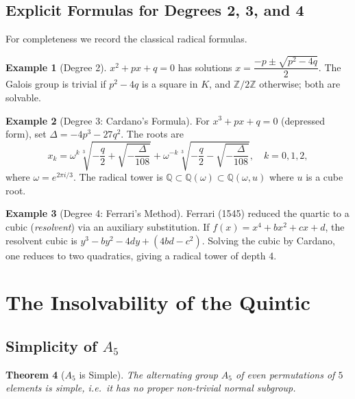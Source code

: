 \documentclass[12pt,a4paper]{amsart}
\newtheorem{theorem}{Theorem}[section]
\theoremstyle{definition}
\newtheorem{example}[theorem]{Example}
\newcommand{\Q}{\mathbb{Q}}
\newcommand{\Z}{\mathbb{Z}}
\begin{document}
\subsection{Explicit Formulas for Degrees 2, 3, and 4}

For completeness we record the classical radical formulas.

\begin{example}[Degree 2]
$x^2 + px + q = 0$ has solutions
$x = \dfrac{-p \pm \sqrt{p^2 - 4q}}{2}$.
The Galois group is trivial if $p^2 - 4q$ is a square in $K$, and $\Z/2\Z$
otherwise; both are solvable.
\end{example}

\begin{example}[Degree 3: Cardano's Formula]
For $x^3 + px + q = 0$ (depressed form), set $\Delta = -4p^3 - 27q^2$.
The roots are
\[
  x_k = \omega^k \sqrt[3]{-\frac{q}{2} + \sqrt{-\frac{\Delta}{108}}}
       + \omega^{-k} \sqrt[3]{-\frac{q}{2} - \sqrt{-\frac{\Delta}{108}}},
  \quad k = 0,1,2,
\]
where $\omega = e^{2\pi i/3}$. The radical tower is
$\Q \subset \Q(\omega) \subset \Q(\omega, u)$ where $u$ is a cube root.
\end{example}

\begin{example}[Degree 4: Ferrari's Method]
Ferrari (1545) reduced the quartic to a cubic (\emph{resolvent}) via an
auxiliary substitution. If $f(x) = x^4 + bx^2 + cx + d$, the resolvent cubic
is $y^3 - by^2 - 4dy + (4bd - c^2)$. Solving the cubic by Cardano, one
reduces to two quadratics, giving a radical tower of depth 4.
\end{example}

\section{The Insolvability of the Quintic}

\subsection{Simplicity of $A_5$}

\begin{theorem}[$A_5$ is Simple]
\label{thm:a5simple}
The alternating group $A_5$ of even permutations of $5$ elements is simple,
i.e.\ it has no proper non-trivial normal subgroup.
\end{theorem}
\end{document}
